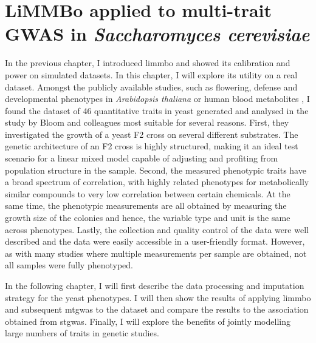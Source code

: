 \chapter{LiMMBo applied to multi-trait GWAS  in \emph{Saccharomyces cerevisiae}}
\label{chapter:yeast}
In the previous chapter, I introduced \gls{limmbo} and showed its calibration and power on simulated datasets. In this chapter, I will explore its utility on a real dataset. Amongst the publicly available studies, such as flowering, defense and developmental phenotypes in \textit{Arabidopsis thaliana} \citep{Atwell2010} or human blood metabolites \citep{Shin2014}, I found the dataset of 46 quantitative traits in yeast generated and analysed in the study by Bloom and colleagues \citep{Bloom2013} most suitable for several reasons. First, they investigated the growth of a yeast F2 cross on several different substrates.  The genetic architecture of an F2 cross is highly structured, making it an ideal test scenario for a linear mixed model capable of adjusting and profiting from population structure in the sample. Second, the measured phenotypic traits have a broad spectrum of correlation, with highly related phenotypes for metabolically similar compounds to very low correlation between certain chemicals. At the same time, the phenotypic measurements are all obtained by measuring the growth size of the colonies and hence, the variable type and unit is the same across phenotypes. Lastly, the collection and quality control of the data were well described and the data were easily accessible in a user-friendly format. However, as with many studies where multiple measurements per sample are obtained, not all samples were fully phenotyped. 

In the following chapter, I will first describe the data processing and imputation strategy for the yeast phenotypes. I will then show the results of applying \gls{limmbo} and subsequent \gls{mtgwas} to the dataset and compare the results to the association obtained from \gls{stgwas}. Finally, I will explore the benefits of jointly modelling large numbers of traits in genetic studies.

